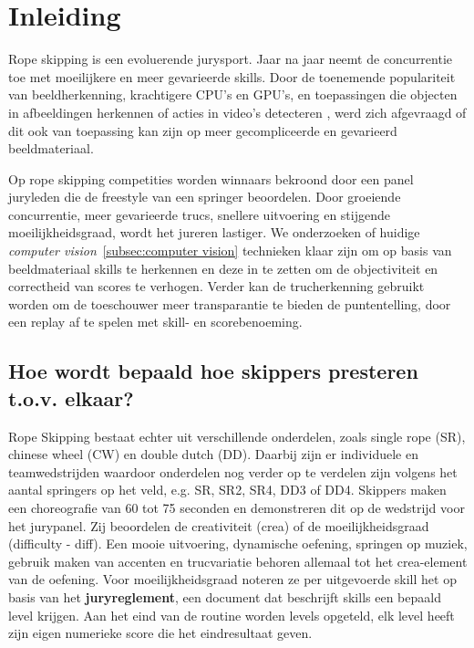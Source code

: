 
\section{Inleiding}%
\label{sec:inleiding}

Rope skipping is een evoluerende jurysport. Jaar na jaar neemt de concurrentie toe met moeilijkere en meer gevarieerde skills. Door de toenemende populariteit van beeldherkenning, krachtigere CPU's en GPU's, en toepassingen die objecten in afbeeldingen herkennen \autocite{Singh_Gill_2022} of acties in video's detecteren \autocite{LUQMAN_2022}, werd zich afgevraagd of dit ook van toepassing kan zijn op meer gecompliceerde en gevarieerd beeldmateriaal.
    
Op rope skipping competities worden winnaars bekroond door een panel  juryleden die de freestyle van een springer beoordelen. Door groeiende concurrentie, meer gevarieerde trucs, snellere uitvoering en stijgende moeilijkheidsgraad, wordt het jureren lastiger. We onderzoeken of huidige \emph{computer vision}~\ref{subsec:computer vision} technieken klaar zijn om op basis van beeldmateriaal skills te herkennen en deze in te zetten om de objectiviteit en correctheid van scores te verhogen. Verder kan de trucherkenning gebruikt worden om de toeschouwer meer transparantie te bieden de puntentelling, door een replay af te spelen met skill- en scorebenoeming.


\subsection{Hoe wordt bepaald hoe skippers presteren t.o.v. elkaar?}

Rope Skipping bestaat echter uit verschillende onderdelen, zoals single rope (SR), chinese wheel (CW) en double dutch (DD). Daarbij zijn er individuele en teamwedstrijden waardoor onderdelen nog verder op te verdelen zijn volgens het aantal springers op het veld, e.g. SR, SR2, SR4, DD3 of DD4. Skippers maken een choreografie van 60 tot 75 seconden en demonstreren dit op de wedstrijd voor het jurypanel. Zij beoordelen de creativiteit (crea) of de moeilijkheidsgraad (difficulty - diff). Een mooie uitvoering, dynamische oefening, springen op muziek, gebruik maken van accenten en trucvariatie behoren allemaal tot het crea-element van de oefening. Voor moeilijkheidsgraad noteren ze per uitgevoerde skill het op basis van het \textbf{juryreglement}, een document dat beschrijft skills een bepaald level krijgen. Aan het eind van de routine worden levels opgeteld, elk level heeft zijn eigen numerieke score die het eindresultaat geven.

